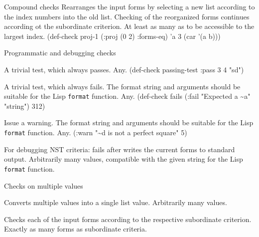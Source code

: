 \begin{criteriaGroup}{Compound checks}
{Rearranges the input forms by selecting a new list according to the
index numbers into the old list.  Checking of the reorganized forms
continues according ot the subordinate criterion.}
{At least as many as to be accessible to the largest
index.}
{}
{\singleEx}
{(def-check proj-1 (:proj (0 2) :forms-eq) 'a 3 (car '(a b)))}

\end{criteriaGroup}

\begin{criteriaGroup}{Programmatic and debugging checks}

{A trivial test, which always passes.}
{Any.}
{\noExpl}
{\singleEx}{(def-check passing-test :pass 3 4 "sd")}

{A trivial test, which always fails.  The format string and arguments
should be suitable for the Lisp \texttt{format} function.}
{Any.}
{\noExpl}
{\singleEx}{(def-check fails (:fail "Expected a \~{}a" "string") 312)}

{Issue a warning.  The format string and arguments should be suitable for
 the Lisp \texttt{format} function.}
{Any.}
{\noExpl}
{\singleEx}{(:warn "\~{}d is not a perfect square" 5)}

{For debugging NST criteria: fails after writes the current forms to
standard output.}
{Arbitrarily many values, compatible with the given string for the
Lisp \texttt{format} function.}
{\noExpl}{\noEx}{}

\end{criteriaGroup}

\begin{criteriaGroup}{Checks on multiple values}

{Converts multiple values into a single list value.}
{Arbitrarily many values.}
{\noExpl}{\noEx}{}

{Checks each of the input forms according to the respective
subordinate criterion.}
{Exactly as many forms as subordinate criteria.}
{\noExpl}{\noEx}{}

\end{criteriaGroup}

